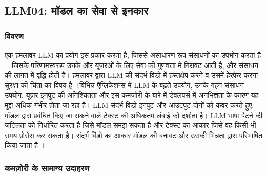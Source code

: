 \documentclass[
]{article}
\author{}
\date{}
\begin{document}
\subsection{LLM04: मॉडल का सेवा से
इनकार}\label{llm04-ux92eux921ux932-ux915-ux938ux935-ux938-ux907ux928ux915ux930}

\subsubsection{विवरण}\label{ux935ux935ux930ux923}

एक हमलावर LLM का प्रयोग इस प्रकार करता है, जिससे असाधारण रूप संसाधनों का उपभोग
करता है । जिसके परिणामस्वरूप उनके और यूज़रओं के लिए सेवा की गुणवत्ता में गिरावट आती है,
और संसाधन की लागत में वृद्धि होती है। हमलावर द्वारा LLM की संदर्भ विंडो में हस्तक्षेप
करने व उसमें हेरफेर करना सुरक्षा की चिंता का विषय है ।विभिन्न ऍप्लिकेशन्स में LLM के बढ़ते
उपयोग, उनके गहन संसाधन उपयोग, यूज़र इनपुट की अनिश्चितता और इस कमजोरी के बारे में
डेवलपर्स में अनभिज्ञता के कारण यह मुद्दा अधिक गंभीर होता जा रहा है। LLM संदर्भ विंडो
इनपुट और आउटपुट दोनों को कवर करते हुए, मॉडल द्वारा प्रबंधित किए जा सकने वाले टेक्स्ट
की अधिकतम लंबाई को दर्शाता है। LLM भाषा पैटर्न की जटिलता को निर्धारित करता है
जिसे मॉडल समझ सकता है और टेक्स्ट का आकार जिसे वह किसी भी समय प्रोसेस कर सकता है।
संदर्भ विंडो का आकार मॉडल की बनावट और उसकी भिन्नता द्वारा परिभाषित किया जाता
है ।

\subsubsection{कमज़ोरी के सामान्य
उदाहरण}\label{ux915ux92eux95bux930-ux915-ux938ux92eux928ux92f-ux909ux926ux939ux930ux923}
\end{document}
